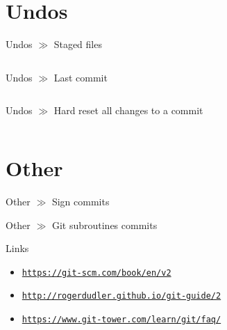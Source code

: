 \documentclass[10pt]{beamer}
\newcommand{\urlCustom}[1]{\href{https://#1}{\textcolor{greyCustom}{\texttt{#1}}}}
\begin{document}
\section{Undos}

\begin{frame}{Undos $\gg$ Staged files}
\inputminted[bgcolor=lightGreyCustom,fontsize=\scriptsize]{sh}{./resources/git_undos_01_stage_files.sh}
\end{frame}

\begin{frame}{Undos $\gg$ Last commit}
\inputminted[bgcolor=lightGreyCustom,fontsize=\scriptsize]{sh}{./resources/git_undos_02_last_commit.sh}
\end{frame}

\begin{frame}{Undos $\gg$ Hard reset all changes to a commit}
\inputminted[bgcolor=lightGreyCustom,fontsize=\scriptsize]{sh}{./resources/git_undos_03_hard_reset.sh}
\end{frame}


\section{Other}

\begin{frame}{Other $\gg$ Sign commits}
\end{frame}

\begin{frame}{Other $\gg$ Git subroutines commits}
\end{frame}


\begin{frame}{Links}

\begin{itemize}
\item\urlCustom{https://git-scm.com/book/en/v2}
\item\urlCustom{http://rogerdudler.github.io/git-guide/2}
\item\urlCustom{https://www.git-tower.com/learn/git/faq/}
\end{itemize}

\begin{center}\doclicenseThis\end{center}

\end{frame}
\end{document}
